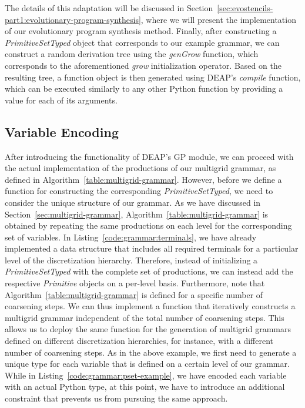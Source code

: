 The details of this adaptation will be discussed in Section~\ref{sec:evostencils-part1:evolutionary-program-synthesis}, where we will present the implementation of our evolutionary program synthesis method.
Finally, after constructing a \emph{PrimitiveSetTyped} object that corresponds to our example grammar, we can construct a random derivation tree using the \emph{genGrow} function, which corresponds to the aforementioned \emph{grow} initialization operator.
Based on the resulting tree, a function object is then generated using DEAP's \emph{compile} function, which can be executed similarly to any other Python function by providing a value for each of its arguments.

\subsection{Variable Encoding}
After introducing the functionality of DEAP's GP module, we can proceed with the actual implementation of the productions of our multigrid grammar, as defined in Algorithm~\ref{table:multigrid-grammar}.
However, before we define a function for constructing the corresponding \emph{PrimitiveSetTyped}, we need to consider the unique structure of our grammar.
As we have discussed in Section~\ref{sec:multigrid-grammar}, Algorithm~\ref{table:multigrid-grammar} is obtained by repeating the same productions on each level for the corresponding set of variables.
In Listing~\ref{code:grammar:terminals}, we have already implemented a data structure that includes all required terminals for a particular level of the discretization hierarchy.
Therefore, instead of initializing a \emph{PrimitiveSetTyped} with the complete set of productions, we can instead add the respective \emph{Primitive} objects on a per-level basis.
Furthermore, note that Algorithm~\ref{table:multigrid-grammar} is defined for a specific number of coarsening steps.
We can thus implement a function that iteratively constructs a multigrid grammar independent of the total number of coarsening steps.
This allows us to deploy the same function for the generation of multigrid grammars defined on different discretization hierarchies, for instance, with a different number of coarsening steps.
As in the above example, we first need to generate a unique type for each variable that is defined on a certain level of our grammar.
While in Listing~\ref{code:grammar:pset-example}, we have encoded each variable with an actual Python type, at this point, we have to introduce an additional constraint that prevents us from pursuing the same approach.
